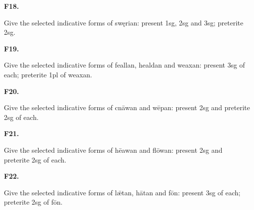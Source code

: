 \par\begin{minipage}{\linewidth}\raggedright
\textbf{F18.}

Give the selected indicative forms of swęrian: present 1sg, 2sg and 3sg; preterite 2sg.

\end{minipage}\par\addvspace{4pt}

\par\begin{minipage}{\linewidth}\raggedright
\textbf{F19.}

Give the selected indicative forms of feallan, healdan and weaxan: present 3sg of each; preterite 1pl of weaxan.

\end{minipage}\par\addvspace{4pt}

\par\begin{minipage}{\linewidth}\raggedright
\textbf{F20.}

Give the selected indicative forms of cnāwan and wēpan: present 2sg and preterite 2sg of each.

\end{minipage}\par\addvspace{4pt}

\par\begin{minipage}{\linewidth}\raggedright
\textbf{F21.}

Give the selected indicative forms of hēawan and flōwan: present 2sg and preterite 2sg of each.

\end{minipage}\par\addvspace{4pt}

\par\begin{minipage}{\linewidth}\raggedright
\textbf{F22.}

Give the selected indicative forms of lǣtan, hātan and fōn: present 3sg of each; preterite 2sg of fōn.

\end{minipage}\par\addvspace{4pt}

